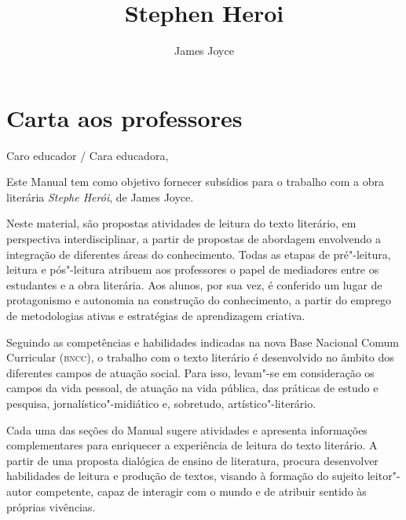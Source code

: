 \documentclass{article}
\begin{document}
\newcommand{\AutorLivro}{James Joyce}
\newcommand{\TituloLivro}{Stephen Heroi}
\newcommand{\Tema}{Ficção, mistério e fantasia}
\newcommand{\Genero}{Romance}
\newcommand{\issnppub}{---}
\newcommand{\issnepub}{---}
\newcommand{\colaborador}{\textbf{Alessandra Cabral, Bruno Gradella e Vicente Castro} é uma pessoa incrível e vai fazer um bom serviço.}


\title{\TituloLivro}
\author{\AutorLivro}
\def\authornotes{\colaborador}

\date{}
\maketitle
\tableofcontents

\pagebreak

\section{Carta aos professores}

Caro educador / Cara educadora,\\\bigskip

Este Manual tem como objetivo fornecer subsídios para o trabalho com a
obra literária \emph{Stephe Herói}, de James Joyce.

Neste material, são propostas atividades de leitura do texto literário,
em perspectiva interdisciplinar, a partir de propostas de abordagem
envolvendo a integração de diferentes áreas do conhecimento. Todas as
etapas de pré"-leitura, leitura e pós"-leitura atribuem aos professores o
papel de mediadores entre os estudantes e a obra literária. Aos alunos,
por sua vez, é conferido um lugar de protagonismo e autonomia na
construção do conhecimento, a partir do emprego de metodologias ativas e
estratégias de aprendizagem criativa.

Seguindo as competências e habilidades indicadas na nova Base Nacional
Comum Curricular (\textsc{bncc}), o trabalho com o texto literário é desenvolvido
no âmbito dos diferentes campos de atuação social. Para isso, levam"-se
em consideração os campos da vida pessoal, de atuação na vida pública,
das práticas de estudo e pesquisa, jornalístico"-midiático e, sobretudo,
artístico"-literário.

Cada uma das seções do Manual sugere atividades e apresenta informações
complementares para enriquecer a experiência de leitura do texto
literário. A partir de uma proposta dialógica de ensino de literatura,
procura desenvolver habilidades de leitura e produção de textos, visando
à formação do sujeito leitor"-autor competente, capaz de interagir com o
mundo e de atribuir sentido às próprias vivências.
\end{document}
